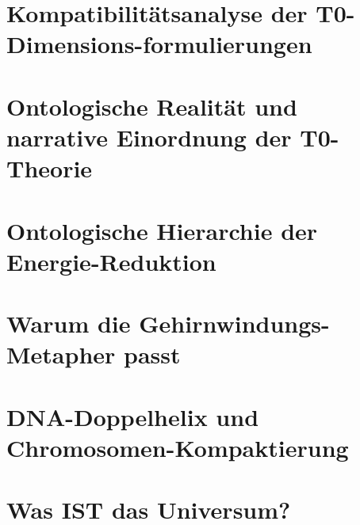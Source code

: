 	\chapter{Kompatibilitätsanalyse der T0-Dimensions-formulierungen}
	
	\chapter{Ontologische Realität und narrative Einordnung der T0-Theorie}
	
	\chapter{Ontologische Hierarchie der Energie-Reduktion}
	
	\chapter{Warum die Gehirnwindungs-Metapher passt}
	
	\chapter{DNA-Doppelhelix und Chromosomen-Kompaktierung}
	
	\chapter{Was IST das Universum?}
	
	

